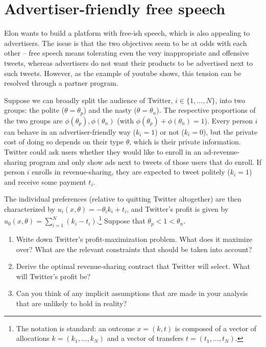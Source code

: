 \documentclass[a4paper]{article}
\begin{document}
\section{Advertiser-friendly free speech}

Elon wants to build a platform with free-ish speech, which is also appealing to advertisers. The issue is that the two objectives seem to be at odds with each other -- free speech means tolerating even the very inappropriate and offensive tweets, whereas advertisers do not want their products to be advertised next to such tweets. However, as the example of youtube shows, this tension can be resolved through a partner program.

Suppose we can broadly split the audience of Twitter, $i \in \{1, ..., N\}$, into two groups: the polite ($\theta=\theta_p$) and the nasty ($\theta=\theta_n$). The respective proportions of the two groups are $\phi(\theta_p),\phi(\theta_n)$ (with $\phi(\theta_p)+\phi(\theta_n)=1$). Every person $i$ can behave in an advertiser-friendly way ($k_i=1$) or not ($k_i=0$), but the private cost of doing so depends on their type $\theta$, which is their private information. 
Twitter could ask users whether they would like to enroll in an ad-revenue-sharing program and only show ads next to tweets of those users that do enroll. If person $i$ enrolls in revenue-sharing, they are expected to tweet politely ($k_i=1$) and receive some payment $t_i$.

The individual preferences (relative to quitting Twitter altogether) are then characterized by $u_i(x,\theta) = -\theta_i k_i + t_i$, and Twitter's profit is given by $u_0(x,\theta) = \sum_{i=1}^N \left( k_i - t_i \right)$.\footnote{The notation is standard: an outcome $x=(k,t)$ is composed of a vector of allocations $k=(k_1,...,k_N)$ and a vector of transfers $t=(t_1,...,t_N)$.} 
Suppose that $\theta_p < 1 < \theta_n$.

\begin{enumerate}
	\item Write down Twitter's profit-maximization problem. What does it maximize over? What are the relevant constraints that should be taken into account? 
	
	\item Derive the optimal revenue-sharing contract that Twitter will select. What will Twitter's profit be?
	
	\item Can you think of any implicit assumptions that are made in your analysis that are unlikely to hold in reality?
\end{enumerate}
\end{document}
